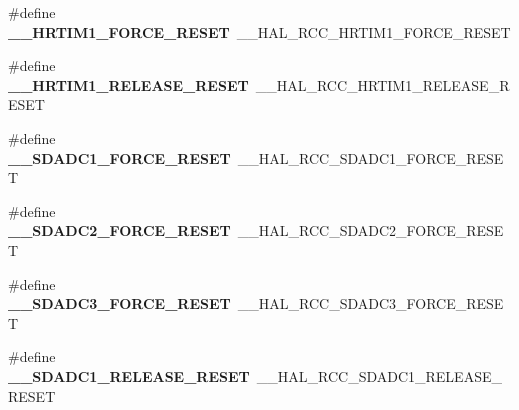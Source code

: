 \begin{DoxyCompactItemize}
\item 
\mbox{\label{group___h_a_l___r_c_c___aliased_ga0ae3e0425993ce111901795d509024d6}} 
\#define {\bfseries \+\_\+\+\_\+\+H\+R\+T\+I\+M1\+\_\+\+F\+O\+R\+C\+E\+\_\+\+R\+E\+S\+ET}~\+\_\+\+\_\+\+H\+A\+L\+\_\+\+R\+C\+C\+\_\+\+H\+R\+T\+I\+M1\+\_\+\+F\+O\+R\+C\+E\+\_\+\+R\+E\+S\+ET
\item 
\mbox{\label{group___h_a_l___r_c_c___aliased_ga94826174a601c902e37f88bcee03059a}} 
\#define {\bfseries \+\_\+\+\_\+\+H\+R\+T\+I\+M1\+\_\+\+R\+E\+L\+E\+A\+S\+E\+\_\+\+R\+E\+S\+ET}~\+\_\+\+\_\+\+H\+A\+L\+\_\+\+R\+C\+C\+\_\+\+H\+R\+T\+I\+M1\+\_\+\+R\+E\+L\+E\+A\+S\+E\+\_\+\+R\+E\+S\+ET
\item 
\mbox{\label{group___h_a_l___r_c_c___aliased_ga4772f1a0159530556eafe5771e89396b}} 
\#define {\bfseries \+\_\+\+\_\+\+S\+D\+A\+D\+C1\+\_\+\+F\+O\+R\+C\+E\+\_\+\+R\+E\+S\+ET}~\+\_\+\+\_\+\+H\+A\+L\+\_\+\+R\+C\+C\+\_\+\+S\+D\+A\+D\+C1\+\_\+\+F\+O\+R\+C\+E\+\_\+\+R\+E\+S\+ET
\item 
\mbox{\label{group___h_a_l___r_c_c___aliased_ga8ac8bc6474aee01e71d62b035fbf6126}} 
\#define {\bfseries \+\_\+\+\_\+\+S\+D\+A\+D\+C2\+\_\+\+F\+O\+R\+C\+E\+\_\+\+R\+E\+S\+ET}~\+\_\+\+\_\+\+H\+A\+L\+\_\+\+R\+C\+C\+\_\+\+S\+D\+A\+D\+C2\+\_\+\+F\+O\+R\+C\+E\+\_\+\+R\+E\+S\+ET
\item 
\mbox{\label{group___h_a_l___r_c_c___aliased_ga6a3f02c81f3fbd193d9d06e429824c68}} 
\#define {\bfseries \+\_\+\+\_\+\+S\+D\+A\+D\+C3\+\_\+\+F\+O\+R\+C\+E\+\_\+\+R\+E\+S\+ET}~\+\_\+\+\_\+\+H\+A\+L\+\_\+\+R\+C\+C\+\_\+\+S\+D\+A\+D\+C3\+\_\+\+F\+O\+R\+C\+E\+\_\+\+R\+E\+S\+ET
\item 
\mbox{\label{group___h_a_l___r_c_c___aliased_ga4c37af0e1de4a052f0a5a66a13369f49}} 
\#define {\bfseries \+\_\+\+\_\+\+S\+D\+A\+D\+C1\+\_\+\+R\+E\+L\+E\+A\+S\+E\+\_\+\+R\+E\+S\+ET}~\+\_\+\+\_\+\+H\+A\+L\+\_\+\+R\+C\+C\+\_\+\+S\+D\+A\+D\+C1\+\_\+\+R\+E\+L\+E\+A\+S\+E\+\_\+\+R\+E\+S\+ET
\item 
\mbox{\label{group___h_a_l___r_c_c___aliased_ga2e4a60fcdf3be6c4ce6414cd859b245c}} 

\end{DoxyCompactItemize}
